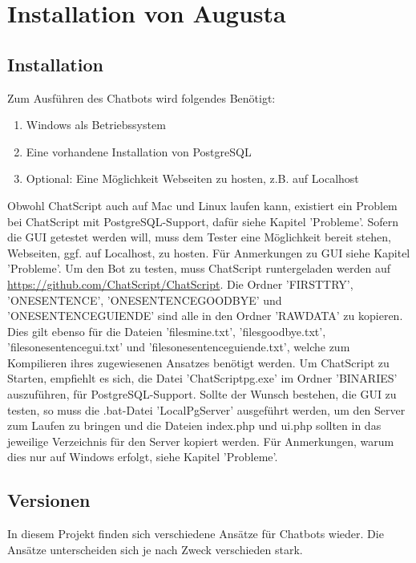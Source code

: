\chapter{Installation von Augusta}
\label{sec:InstallationAugusta}

\section{Installation}
\label{sec:Installation}

Zum Ausführen des Chatbots wird folgendes Benötigt:

\begin{enumerate}
\item {Windows als Betriebssystem}
\item {Eine vorhandene Installation von PostgreSQL}
\item {Optional: Eine Möglichkeit Webseiten zu hosten, z.B. auf Localhost}
\end{enumerate}

Obwohl ChatScript auch auf Mac und Linux laufen kann, existiert ein Problem bei ChatScript mit PostgreSQL-Support, dafür siehe Kapitel 'Probleme'. Sofern die GUI getestet werden will, muss dem Tester eine Möglichkeit bereit stehen, Webseiten, ggf. auf Localhost, zu hosten. Für Anmerkungen zu GUI siehe Kapitel 'Probleme'. 
Um den Bot zu testen, muss ChatScript runtergeladen werden auf \url{https://github.com/ChatScript/ChatScript}. Die Ordner 'FIRSTTRY', 'ONESENTENCE', 'ONESENTENCEGOODBYE' und 'ONESENTENCEGUIENDE' sind alle in den Ordner 'RAWDATA' zu kopieren. Dies gilt ebenso für die Dateien 'filesmine.txt', 'filesgoodbye.txt', 'filesonesentencegui.txt' und 'filesonesentenceguiende.txt', welche zum Kompilieren ihres zugewiesenen Ansatzes benötigt werden. 
Um ChatScript zu Starten, empfiehlt es sich, die Datei 'ChatScriptpg.exe' im Ordner 'BINARIES' auszuführen, für PostgreSQL-Support. 
Sollte der Wunsch bestehen, die GUI zu testen, so muss die .bat-Datei 'LocalPgServer' ausgeführt werden, um den Server zum Laufen zu bringen und die Dateien index.php und ui.php sollten in das jeweilige Verzeichnis für den Server kopiert werden. 
Für Anmerkungen, warum dies nur auf Windows erfolgt, siehe Kapitel 'Probleme'. 

\section{Versionen}
\label{Versionen}

In diesem Projekt finden sich verschiedene Ansätze für Chatbots wieder. Die Ansätze unterscheiden sich je nach Zweck verschieden stark.

